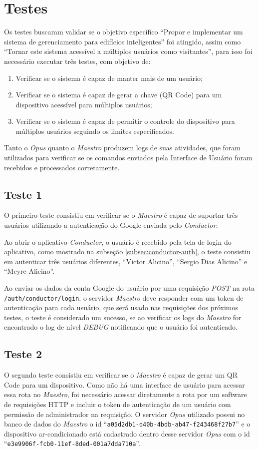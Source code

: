 \section{Testes}

Os testes buscaram validar se o objetivo específico ``Propor e implementar um sistema de gerenciamento para edifícios inteligentes'' foi atingido,
assim como  ``Tornar este sistema acessível a múltiplos usuários como visitantes'', para isso foi necessário executar três testes,
com objetivo de: 
\begin{enumerate}
    \item Verificar se o sistema é capaz de manter mais de um usuário;
    \item Verificar se o sistema é capaz de gerar a chave (QR Code) para um dispositivo acessível para múltiplos usuários;
    \item Verificar se o sistema é capaz de permitir o controle do dispositivo para múltiplos usuários seguindo os limites especificados.
\end{enumerate}

Tanto o \emph{Opus} quanto o \emph{Maestro} produzem logs de suas atividades, que foram utilizados para verificar se os comandos enviados
pela Interface de Usuário foram recebidos e processados corretamente.

\subsection{Teste 1}
O primeiro teste consistiu em verificar se o \emph{Maestro} é capaz de suportar três usuários utilizando a autenticação do Google enviada pelo
\emph{Conductor}.

Ao abrir o aplicativo \emph{Conductor}, o usuário é recebido pela tela de login do aplicativo, como mostrado na subseção \ref{subsec:conductor-auth},
o teste consistiu em autenticar três usuários diferentes, ``Victor Alicino'', ``Sergio Dias Alicino'' e ``Meyre Alicino''.

Ao enviar os dados da conta Google do usuário por uma requisição \emph{POST} na rota \lstinline{/auth/conductor/login}, o
servidor \emph{Maestro} deve responder com um token de autenticação para cada usuário, que será usado nas requisições dos próximos testes,
o teste é considerado um sucesso, se ao verificar os logs do \emph{Maestro} for encontrado o log de nível \emph{DEBUG} notificando que o
usuário foi autenticado.

\subsection{Teste 2}
O segundo teste consistiu em verificar se o \emph{Maestro} é capaz de gerar um QR Code para um dispositivo. 
Como não há uma interface de usuário para acessar essa rota no \emph{Maestro}, foi necessário acessar diretamente a rota por um software de
requisições HTTP e incluir o token de autenticação de um usuário com permissão de administrador na requisição.
O servidor \emph{Opus} utilizado possui no banco de dados do \emph{Maestro} o id ``\lstinline{a05d2db1-d40b-4bdb-ab47-f243468f27b7}'' e o
dispositivo ar-condicionado está cadastrado dentro desse servidor \emph{Opus} com o id ``\lstinline{e3e9906f-fcb0-11ef-8ded-001a7dda710a}''.

